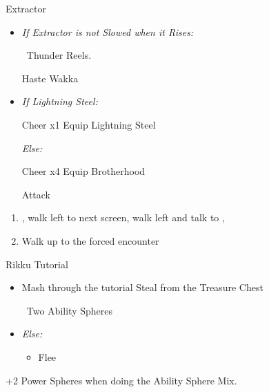 \begin{battle}[4000]{Extractor}
    \begin{itemize}
        \tidusf Haste self
        \wakkaf If anyone is below 216 HP Hi-Potion them, otherwise Attack
        \tidusf Attack Extractor until you apply Slow
        \item \textit{If Extractor is not Slowed when it Rises:}
        \begin{itemize}
            \wakkaf \od\ Thunder Reels.
        \end{itemize}
        \tidusf Haste Wakka
        \item \textit{If Lightning Steel:}
        \begin{itemize}
            \tidusf Cheer x1
            \tidusf Equip Lightning Steel
        \end{itemize}
        \textit{Else:}
        \begin{itemize}
            \tidusf Cheer x4
            \tidusf Equip Brotherhood
        \end{itemize}
        \tidusf Attack
    \end{itemize}
\end{battle}
\begin{enumerate}[resume]
    \item \sd, walk left to next screen, walk left and talk to \rikku, \sd
    \item Walk up to the forced encounter
\end{enumerate}
\begin{battle}{Rikku Tutorial}
    \begin{itemize}
        \item Mash through the tutorial
        \rikkuf Steal from the Treasure Chest
        \begin{itemize}
            \rikkuf \od\ Two Ability Spheres
        \end{itemize}
        \item \textit{Else:}
        \begin{itemize}
            \rikkuf \od\ Two Potions or Hi-Potions
            \rikkuf Defend
            \item Flee
        \end{itemize}
    \end{itemize}
    +2 Power Spheres when doing the Ability Sphere Mix.
\end{battle}
